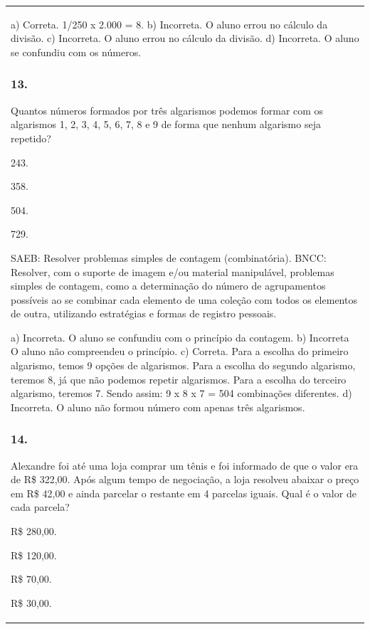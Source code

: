 \begin{mdframed}[linewidth=2pt,linecolor=salmao,roundcorner=2pt]
\begin{escolha}
{{{\begin{longtable}[]{@{}l@{}}
\begin{itemize}
{\begin{escolha}
a) Correta. 1/250 x 2.000 = 8.
b) Incorreta. O aluno errou no cálculo da divisão.
c) Incorreta. O aluno errou no cálculo da divisão.
d) Incorreta. O aluno se confundiu com os números.

\subsubsection{13.}

Quantos números formados por três algarismos podemos formar com os
algarismos 1, 2, 3, 4, 5, 6, 7, 8 e 9 de forma que nenhum algarismo seja
repetido?

\begin{escolha}
\item
  243.
\item
  358.
\item
  504.
\item
  729.
\end{escolha}

SAEB: Resolver problemas simples de contagem (combinatória).
BNCC: Resolver, com o suporte de imagem e/ou material manipulável, problemas simples
de contagem, como a determinação do número de agrupamentos possíveis ao se combinar cada
elemento de uma coleção com todos os elementos de outra, utilizando estratégias e formas de
registro pessoais.

a) Incorreta. O aluno se confundiu com o princípio da contagem.
b) Incorreta O aluno não compreendeu o princípio.
c) Correta. Para a escolha do primeiro algarismo, temos 9 opções de algarismos. Para
a escolha do segundo algarismo, teremos 8, já que não podemos repetir
algarismos. Para a escolha do terceiro algarismo, teremos 7. Sendo assim: 9 x 8 x 7 = 504 combinações diferentes.
d) Incorreta. O aluno não formou número com apenas três algarismos.

\subsubsection{14.}

Alexandre foi até uma loja comprar um tênis e foi informado de que o valor
era de R\$ 322,00. Após algum tempo de negociação, a loja resolveu
abaixar o preço em R\$ 42,00 e ainda parcelar o restante em 4 parcelas iguais.
Qual é o valor de cada parcela?

\begin{escolha}
\item
  R\$ 280,00.
\item
  R\$ 120,00.
\item
  R\$ 70,00.
\item
  R\$ 30,00.
\end{escolha}


\end{escolha}}
\end{itemize}
\end{longtable}}}}
\end{escolha}
\end{mdframed}
